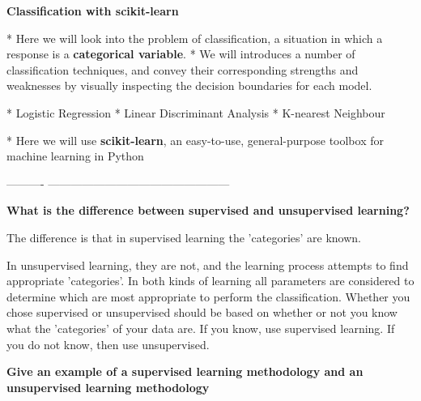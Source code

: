 
 \textbf{Classification with scikit-learn}

*   Here we will look into the problem of classification, a situation in which a response is a \textbf{categorical variable}. 
*   We will introduces a number of classification techniques, and 
convey their corresponding strengths and weaknesses by visually inspecting the decision boundaries for each model.
\begin{enumerate}
*   Logistic Regression
*   Linear Discriminant Analysis
*   K-nearest Neighbour
\end{enumerate}
*   Here we will use \textbf{scikit-learn}, an easy-to-use, general-purpose toolbox for machine learning in Python
	

----------%
------------------------------------------------%


\textbf{What is the difference between supervised and unsupervised learning?}

The difference is that in supervised learning the 'categories' are known.

In unsupervised learning, they are not, and the learning process attempts to find appropriate 'categories'. In both kinds of learning all parameters are considered to determine which are most appropriate to perform the classification.
Whether you chose supervised or unsupervised should be based on whether or not you know what the
'categories' of your data are. If you know, use supervised learning. If you do not know, then use
unsupervised.


\textbf{Give an example of a supervised learning methodology and an unsupervised learning methodology}




